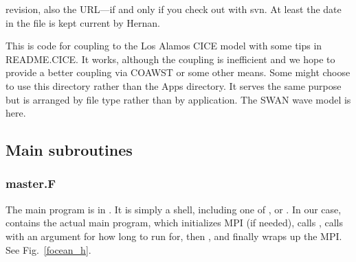 \begin{klist}
\begin{klist}
     revision, also the  URL---if and only if you
    check out with svn. At least the date in the file is kept current
    by Hernan.
\end{klist}
   This is code for coupling to the Los Alamos CICE model
    with some tips in README.CICE. It works, although the coupling is
    inefficient and we hope to provide a better coupling via COAWST or
    some other means.
   Some might choose to use this directory rather than
    the Apps directory. It serves the same purpose but is arranged
    by file type rather than by application.
   The SWAN wave model is here.
\end{klist}

\subsection{Main subroutines}
\label{Master}

\subsubsection{master.F}
The main program is in . It is simply a shell, including
one of ,  or . In
our case,  contains the actual main program, which
initializes MPI (if needed), calls ,
calls  with an argument for how long to run for,
then , and finally wraps up the MPI.
See Fig.\ \ref{focean_h}.

